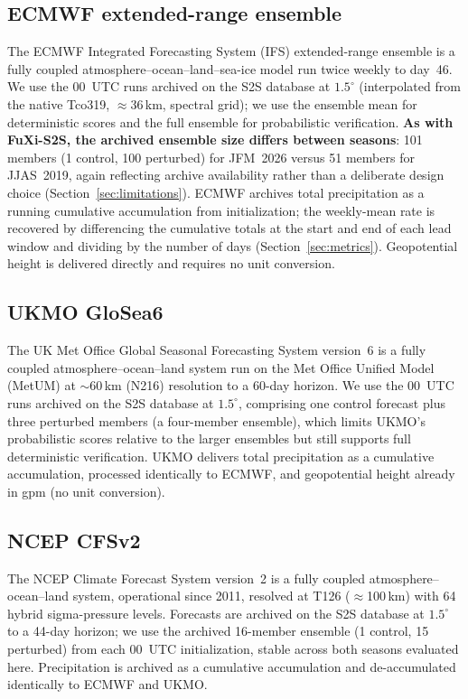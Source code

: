 \documentclass[11pt,a4paper]{article}
\begin{document}
\subsection{ECMWF extended-range ensemble}\label{sec:ecmwf}

The ECMWF Integrated Forecasting System (IFS) extended-range ensemble
\citep{vitart2014} is a fully coupled atmosphere--ocean--land--sea-ice model
run twice weekly to day~46. We use the 00~UTC runs archived on the S2S
database \citep{vitart2017} at $1.5^{\circ}$ (interpolated from the native
Tco319, $\approx$36\,km, spectral grid); we use the ensemble mean for
deterministic scores and the full ensemble for probabilistic verification.
\textbf{As with FuXi-S2S, the archived ensemble size differs between seasons}:
101 members (1 control, 100 perturbed) for JFM~2026 versus 51 members for
JJAS~2019, again reflecting archive availability rather than a deliberate
design choice (Section~\ref{sec:limitations}). ECMWF archives total
precipitation as a running cumulative accumulation from initialization; the
weekly-mean rate is recovered by differencing the cumulative totals at the
start and end of each lead window and dividing by the number of days
(Section~\ref{sec:metrics}). Geopotential height is delivered directly and
requires no unit conversion.

\subsection{UKMO GloSea6}\label{sec:ukmo}

The UK Met Office Global Seasonal Forecasting System version~6
\citep[GloSea6;][]{maclauchlan2014} is a fully coupled atmosphere--ocean--land
system run on the Met Office Unified Model (MetUM) at $\sim$60\,km (N216)
resolution to a 60-day horizon. We use the 00~UTC runs archived on the S2S
database at $1.5^{\circ}$, comprising one control forecast plus three
perturbed members (a four-member ensemble), which limits UKMO's probabilistic
scores relative to the larger ensembles but still supports full deterministic
verification. UKMO delivers total precipitation as a cumulative accumulation,
processed identically to ECMWF, and geopotential height already in gpm
(no unit conversion).

\subsection{NCEP CFSv2}\label{sec:ncep}

The NCEP Climate Forecast System version~2 \citep{saha2014} is a fully coupled
atmosphere--ocean--land system, operational since 2011, resolved at T126
($\approx$100\,km) with 64 hybrid sigma-pressure levels. Forecasts are
archived on the S2S database at $1.5^{\circ}$ to a 44-day horizon; we use the
archived 16-member ensemble (1 control, 15 perturbed) from each 00~UTC
initialization, stable across both seasons evaluated here. Precipitation is
archived as a cumulative accumulation and de-accumulated identically to
ECMWF and UKMO.
\end{document}
